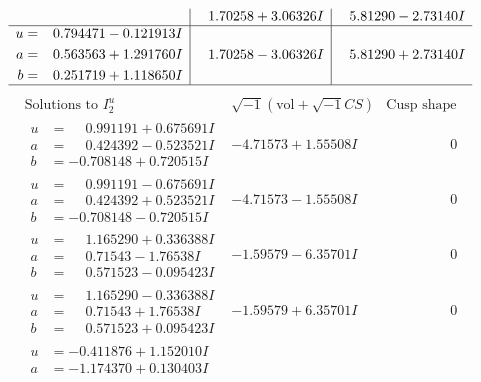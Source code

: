 \documentclass[1p]{elsarticle_modified}
\theoremstyle{definition}
\newcommand{\I}{\sqrt{-1}}
\begin{document}
$$\begin{array}{c|c|c}
 & \phantom{-}1.70258 + 3.06326 I & \phantom{-}5.81290 - 2.73140 I \\ \hline\begin{aligned}
u &= \phantom{-}0.794471 - 0.121913 I \\
a &= \phantom{-}0.563563 + 1.291760 I \\
b &= \phantom{-}0.251719 + 1.118650 I\end{aligned}
 & \phantom{-}1.70258 - 3.06326 I & \phantom{-}5.81290 + 2.73140 I\\
 \hline 
 \end{array}$$\newpage$$\begin{array}{c|c|c}  
\text{Solutions to }I^u_{2}& \I (\text{vol} + \sqrt{-1}CS) & \text{Cusp shape}\\
 \hline 
\begin{aligned}
u &= \phantom{-}0.991191 + 0.675691 I \\
a &= \phantom{-}0.424392 - 0.523521 I \\
b &= -0.708148 + 0.720515 I\end{aligned}
 & -4.71573 + 1.55508 I & \phantom{-0.000000 } 0 \\ \hline\begin{aligned}
u &= \phantom{-}0.991191 - 0.675691 I \\
a &= \phantom{-}0.424392 + 0.523521 I \\
b &= -0.708148 - 0.720515 I\end{aligned}
 & -4.71573 - 1.55508 I & \phantom{-0.000000 } 0 \\ \hline\begin{aligned}
u &= \phantom{-}1.165290 + 0.336388 I \\
a &= \phantom{-}0.71543 - 1.76538 I \\
b &= \phantom{-}0.571523 - 0.095423 I\end{aligned}
 & -1.59579 - 6.35701 I & \phantom{-0.000000 } 0 \\ \hline\begin{aligned}
u &= \phantom{-}1.165290 - 0.336388 I \\
a &= \phantom{-}0.71543 + 1.76538 I \\
b &= \phantom{-}0.571523 + 0.095423 I\end{aligned}
 & -1.59579 + 6.35701 I & \phantom{-0.000000 } 0 \\ \hline\begin{aligned}
u &= -0.411876 + 1.152010 I \\
a &= -1.174370 + 0.130403 I \\

\end{aligned}
\end{array}$$
\end{document}

